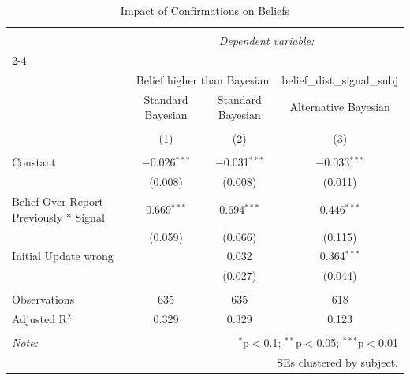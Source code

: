 
\begin{table}[!htbp] \centering 
  \caption{Impact of Confirmations on Beliefs} 
  \label{} 
\begin{tabular}{@{\extracolsep{5pt}}lccc} 
\\[-1.8ex]\hline 
\hline \\[-1.8ex] 
 & \multicolumn{3}{c}{\textit{Dependent variable:}} \\ 
\cline{2-4} 
\\[-1.8ex] & \multicolumn{2}{c}{Belief higher than Bayesian} & belief\_dist\_signal\_subj \\ 
 & Standard Bayesian & Standard Bayesian & Alternative Bayesian \\ 
\\[-1.8ex] & (1) & (2) & (3)\\ 
\hline \\[-1.8ex] 
 Constant & $-$0.026$^{***}$ & $-$0.031$^{***}$ & $-$0.033$^{***}$ \\ 
  & (0.008) & (0.008) & (0.011) \\ 
  Belief Over-Report Previously * Signal & 0.669$^{***}$ & 0.694$^{***}$ & 0.446$^{***}$ \\ 
  & (0.059) & (0.066) & (0.115) \\ 
  Initial Update wrong &  & 0.032 & 0.364$^{***}$ \\ 
  &  & (0.027) & (0.044) \\ 
 \hline \\[-1.8ex] 
Observations & 635 & 635 & 618 \\ 
Adjusted R$^{2}$ & 0.329 & 0.329 & 0.123 \\ 
\hline 
\hline \\[-1.8ex] 
\textit{Note:}  & \multicolumn{3}{r}{$^{*}$p$<$0.1; $^{**}$p$<$0.05; $^{***}$p$<$0.01} \\ 
 & \multicolumn{3}{r}{SEs clustered by subject.} \\ 
\end{tabular} 
\end{table} 
